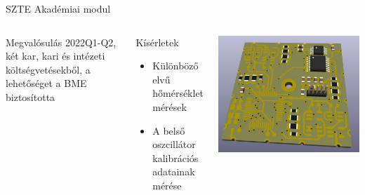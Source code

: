 \begin{frame}{SZTE Akadémiai modul}
\begin{columns}[c]
\begin{block}{Megvalósulás}
2022Q1-Q2, két kar, kari és intézeti költségvetésekből, a lehetőséget a BME biztosította
\end{block}
\begin{block}{Kísérletek}
	\begin{itemize}
		\item Különböző elvű hőmérséklet mérések
		\item A belső oszcillátor kalibrációs adatainak mérése
	\end{itemize}
\end{block}

	\begin{center}
		\includegraphics[width=.8\linewidth]{tanszeki3d}
	\end{center}

\end{columns}
\end{frame}

